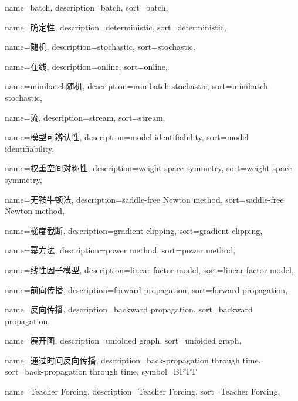 {
  name=batch,
  description={batch},
  sort={batch},
}

{
  name=确定性,
  description={deterministic},
  sort={deterministic},
}

{
  name=随机,
  description={stochastic},
  sort={stochastic},
}

{
  name=在线,
  description={online},
  sort={online},
}

{
  name=minibatch随机, %
  description={minibatch stochastic},
  sort={minibatch stochastic},
}

{
  name=流,
  description={stream},
  sort={stream},
}

{
  name=模型可辨认性,
  description={model identifiability},
  sort={model identifiability},
}

{
  name=权重空间对称性,
  description={weight space symmetry},
  sort={weight space symmetry},
}

{
  name=无鞍牛顿法,
  description={saddle-free Newton method},
  sort={saddle-free Newton method},
}

{
  name=梯度截断,
  description={gradient clipping},
  sort={gradient clipping},
}

{
  name=幂方法,
  description={power method},
  sort={power method},
}

{
  name=线性因子模型,
  description={linear factor model},
  sort={linear factor model},
}

{
  name=前向传播,
  description={forward propagation},
  sort={forward propagation},
}

{
  name=反向传播,
  description={backward propagation},
  sort={backward propagation},
}

{
  name=展开图,
  description={unfolded graph},
  sort={unfolded graph},
}

{
  name=通过时间反向传播,
  description={back-propagation through time},
  sort={back-propagation through time},
  symbol={BPTT}
}

{
  name=Teacher Forcing,
  description={Teacher Forcing},
  sort={Teacher Forcing},
}

